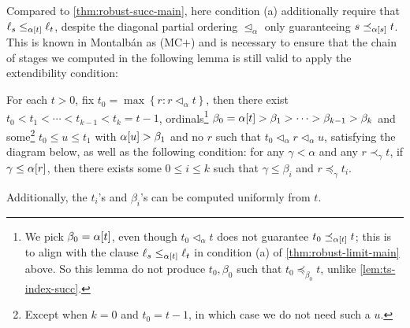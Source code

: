 \documentclass[11pt]{article}
\theoremstyle{plain}
\theoremstyle{definition}
\begin{document}
Compared to \autoref{thm:robust-succ-main}, here condition (a) additionally require that $\ell_s \leq_{\alpha\mleft[t\mright]} \ell_t$, despite the diagonal partial ordering $\unlhd_\alpha$ only guaranteeing $s \preceq_{\alpha\mleft[s\mright]} t$. This is known in Montalb\'an \cite{montalban26-computable-structure} as (MC$+$) and is necessary to ensure that the chain of stages we computed in the following lemma is still valid to apply the extendibility condition:

\begin{lemma}
  \label{lem:ts-index-limit}
  For each $t > 0$, fix $t_0 = \max \left\{r : r \lhd_\alpha t\right\}$, then there exist $t_0 < t_1 < \cdots < t_{k - 1} < t_k = t - 1$, ordinals\footnote{We pick $\beta_0 = \alpha\mleft[t\mright]$, even though $t_0 \lhd_\alpha t$ does not guarantee $t_0 \preceq_{\alpha\mleft[t\mright]} t$; this is to align with the clause $\ell_s \leq_{\alpha\mleft[t\mright]} \ell_t$ in condition (a) of \autoref{thm:robust-limit-main} above. So this lemma do not produce $t_0, \beta_0$ such that $t_0 \preceq_{\beta_0} t$, unlike \autoref{lem:ts-index-succ}.} $\beta_0 = \alpha\mleft[t\mright] > \beta_1 > \cdots > \beta_{k - 1} > \beta_k$ and some\footnote{Except when $k = 0$ and $t_0 = t - 1$, in which case we do not need such a $u$.} $t_0 \leq u \leq t_1$ with $\alpha\mleft[u\mright] > \beta_1$ and no $r$ such that $t_0 \lhd_\alpha r \lhd_\alpha u$, satisfying the diagram below, as well as the following condition: for any $\gamma < \alpha$ and any $r \prec_\gamma t$, if $\gamma \leq \alpha\mleft[r\mright]$, then there exists some $0 \leq i \leq k$ such that $\gamma \leq \beta_i$ and $r \preceq_\gamma t_i$.
  \begin{center}
  \end{center}
  Additionally, the $t_i$'s and $\beta_i$'s can be computed uniformly from $t$.
\end{lemma}
\end{document}
